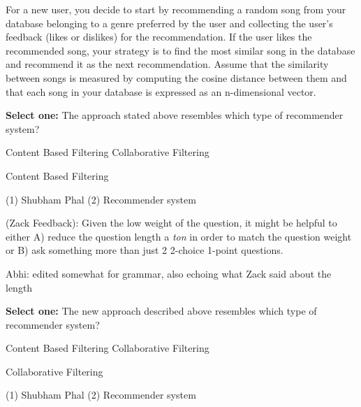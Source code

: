 \begin{parts}
For a new user, you decide to start by recommending a random song from your database belonging to a genre preferred by the user and collecting the user’s feedback (likes or dislikes) for the recommendation. If the user likes the recommended song, your strategy is to find the most similar song in the database and recommend it as the next recommendation. Assume that the similarity between songs is measured by computing the cosine distance between them and that each song in your database is expressed as an n-dimensional vector.


\begin{subparts}
\subpart[1] \textbf{Select one:} The approach stated above resembles which type of recommender system?
    \begin{checkboxes}
     \choice Content Based Filtering 
     \choice Collaborative Filtering
    \end{checkboxes}
    \begin{soln}
    Content Based Filtering
    \end{soln}
    \begin{qauthor}
    (1) Shubham Phal (2) Recommender system
    
    (Zack Feedback): Given the low weight of the question, it might be helpful to either A) reduce the question length a \textit{ton} in order to match the question weight or B) ask something more than just 2 2-choice 1-point questions.

    Abhi: edited somewhat for grammar, also echoing what Zack said about the length
    \end{qauthor}


\subpart[1] \textbf{Select one:} The new approach described above resembles which type of recommender system?
    \begin{checkboxes}
     \choice Content Based Filtering 
     \choice Collaborative Filtering
    \end{checkboxes}
    \begin{soln}
    Collaborative Filtering
    \end{soln}
    \begin{qauthor}
    (1) Shubham Phal (2) Recommender system
    

\end{qauthor}
\end{subparts}
\end{parts}

